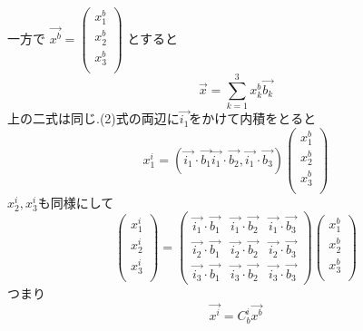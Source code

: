 \documentclass[class=article, crop=false, preview=false, dvipdfmx, a4paper]{standalone}
\begin{document}
一方で
$\vec{x^b}=
    \begin{pmatrix}
    	x^b_1\\
        x^b_2\\
        x^b_3\\
    \end{pmatrix}$
とすると
\begin{equation}
\vec{x} = \sum_{k=1}^{3} x^b_k \vec{b_k} 
\end{equation}
上の二式は同じ.(2)式の両辺に$\vec{i_1}$をかけて内積をとると
\[ x^i_1 =
	\left(
		\vec{i_1} \cdot \vec{b_1}
        \vec{i_1} \cdot \vec{b_2},
        \vec{i_1} \cdot \vec{b_3}
    \right)
	\begin{pmatrix}
    	x^b_1\\
        x^b_2\\
        x^b_3\\
    \end{pmatrix}
\]
$x^i_2, x^i_3$も同様にして
\[
\begin{pmatrix}
	x^i_1\\
    x^i_2\\
    x^i_3\\
\end{pmatrix}
=
\begin{pmatrix}
	\vec{i_1} \cdot \vec{b_1} & 
    \vec{i_1} \cdot \vec{b_2} & 
    \vec{i_1} \cdot \vec{b_3} \\
    \vec{i_2} \cdot \vec{b_1} &
    \vec{i_2} \cdot \vec{b_2} &
    \vec{i_2} \cdot \vec{b_3} \\
    \vec{i_3} \cdot \vec{b_1} & 
    \vec{i_3} \cdot \vec{b_2} & 
    \vec{i_3} \cdot \vec{b_3}
\end{pmatrix}
\begin{pmatrix}
	x^b_1\\
    x^b_2\\
    x^b_3\\
\end{pmatrix}
\]
つまり
\[ \vec{x^i} = C^i_b\vec{x^b} \]
\end{document}
